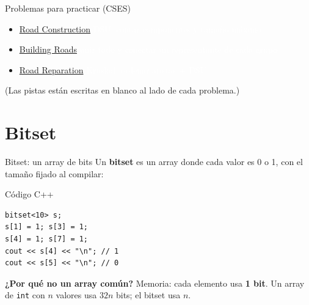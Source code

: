 \documentclass{beamer}
\begin{document}
\begin{frame}{Problemas para practicar (CSES)}
    \begin{itemize}
        \item \href{https://cses.fi/problemset/task/1676}{Road Construction}
              \textcolor{white}{\scriptsize DSU: contar componentes y tamaño máximo}
        \item \href{https://cses.fi/problemset/task/1666}{Building Roads}
              \textcolor{white}{\scriptsize unir todo y conectar un representante de cada grupo}
        \item \href{https://cses.fi/problemset/task/1675}{Road Reparation}
              \textcolor{white}{\scriptsize Kruskal: ordenar aristas + DSU}
    \end{itemize}

    \vspace{0.2cm}
    \small (Las pistas están escritas en blanco al lado de cada problema.)
\end{frame}


\section{Bitset}

\begin{frame}[fragile]{Bitset: un array de bits}
    Un \textbf{bitset} es un array donde cada valor es 0 o 1, con el tamaño
    fijado al compilar:
    \begin{block}{Código C++}
\begin{verbatim}
bitset<10> s;
s[1] = 1; s[3] = 1;
s[4] = 1; s[7] = 1;
cout << s[4] << "\n"; // 1
cout << s[5] << "\n"; // 0
\end{verbatim}
    \end{block}

    \vspace{0.1cm}
    \textbf{¿Por qué no un array común?} Memoria: cada elemento usa
    \textbf{1 bit}. Un array de \texttt{int} con $n$ valores usa $32n$ bits;
    el bitset usa $n$.
\end{frame}
\end{document}
